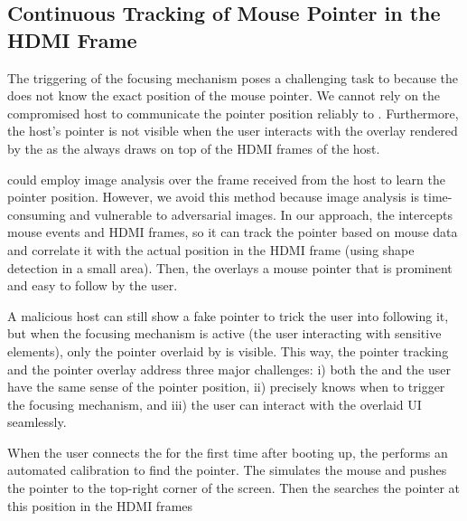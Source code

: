 \subsection{Continuous Tracking of Mouse Pointer in the HDMI Frame}
\label{sec:systemDesign:analysis}


The triggering of the focusing mechanism poses a challenging task to \name because the \device does not know the exact position of the mouse pointer. We cannot rely on the compromised host to communicate the pointer position reliably to \device. Furthermore, the host's pointer is not visible when the user interacts with the overlay rendered by the \device as the \device always draws on top of the HDMI frames of the host. 

\device could employ image analysis over the frame received from the host to learn the pointer position. However, we avoid this method because image analysis is time-consuming and vulnerable to adversarial images. In our approach, the \device intercepts mouse events and HDMI frames, so it can track the pointer based on mouse data and correlate it with the actual position in the HDMI frame (using shape detection in a small area). Then, the \device overlays a mouse pointer that is prominent and easy to follow by the user. 

A malicious host can still show a fake pointer to trick the user into following it, but when the focusing mechanism is active (the user interacting with sensitive elements), only the pointer overlaid by \device is visible. This way, the pointer tracking and the pointer overlay address three major challenges: i) both the \device and the user have the same sense of the pointer position, ii) \device precisely knows when to trigger the focusing mechanism, and iii) the user can interact with the overlaid UI seamlessly. 


\label{sec:systemDesign:analysis:calibration} 
When the user connects the \device for the first time after booting up, the \device performs an automated calibration to find the pointer. The \device simulates the mouse and pushes the pointer to the top-right corner of the screen. Then the \device searches the pointer at this position in the HDMI frames

